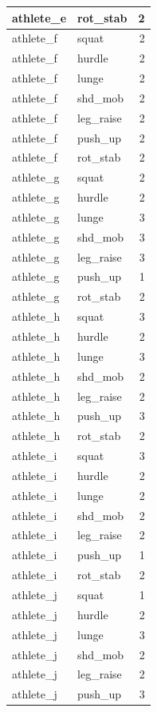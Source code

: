 \documentclass[
]{book}
\begin{document}
\begin{tabular}{l|l|r}
\hline
athlete\_e & rot\_stab & 2\\
\hline
athlete\_f & squat & 2\\
\hline
athlete\_f & hurdle & 2\\
\hline
athlete\_f & lunge & 2\\
\hline
athlete\_f & shd\_mob & 2\\
\hline
athlete\_f & leg\_raise & 2\\
\hline
athlete\_f & push\_up & 2\\
\hline
athlete\_f & rot\_stab & 2\\
\hline
athlete\_g & squat & 2\\
\hline
athlete\_g & hurdle & 2\\
\hline
athlete\_g & lunge & 3\\
\hline
athlete\_g & shd\_mob & 3\\
\hline
athlete\_g & leg\_raise & 3\\
\hline
athlete\_g & push\_up & 1\\
\hline
athlete\_g & rot\_stab & 2\\
\hline
athlete\_h & squat & 3\\
\hline
athlete\_h & hurdle & 2\\
\hline
athlete\_h & lunge & 3\\
\hline
athlete\_h & shd\_mob & 2\\
\hline
athlete\_h & leg\_raise & 2\\
\hline
athlete\_h & push\_up & 3\\
\hline
athlete\_h & rot\_stab & 2\\
\hline
athlete\_i & squat & 3\\
\hline
athlete\_i & hurdle & 2\\
\hline
athlete\_i & lunge & 2\\
\hline
athlete\_i & shd\_mob & 2\\
\hline
athlete\_i & leg\_raise & 2\\
\hline
athlete\_i & push\_up & 1\\
\hline
athlete\_i & rot\_stab & 2\\
\hline
athlete\_j & squat & 1\\
\hline
athlete\_j & hurdle & 2\\
\hline
athlete\_j & lunge & 3\\
\hline
athlete\_j & shd\_mob & 2\\
\hline
athlete\_j & leg\_raise & 2\\
\hline
athlete\_j & push\_up & 3\\

\end{tabular}
\end{document}
